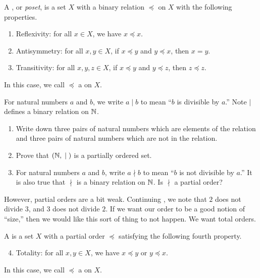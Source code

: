 \documentclass[../notes.tex]{subfiles}
\begin{document}
\begin{definition}
    A , or \textit{poset}, is a set $X$ with a binary relation $\preceq$ on $X$ with the following properties.
    \begin{enumerate}[label=(\alph*)]
        \item Reflexivity: for all $x \in X$, we have $x \preceq x$.
        \item Antisymmetry: for all $x, y \in X$, if $x \preceq y$ and $y \preceq x$, then $x = y$.
        \item Transitivity: for all $x, y, z \in X$, if $x \preceq y$ and $y \preceq z$, then $z \preceq z$.
    \end{enumerate}
    In this case, we call $\preceq$ a  on $X$. %
\end{definition}
\begin{exercise} \label{exe:div-on-n}
    For natural numbers $a$ and $b$, we write $a \mid b$ to mean ``$b$ is divisible by $a$.'' Note $\mid$ defines a binary relation on $\mathbb N$.
    \begin{enumerate}[label=(\alph*)]
        \item Write down three pairs of natural numbers which are elements of the relation and three pairs of natural numbers which are not in the relation.
        \item Prove that $(\mathbb N, {}\mid{})$ is a partially ordered set.
        \item For natural numbers $a$ and $b$, write $a\nmid b$ to mean ``$b$ is not divisible by $a$.'' It is also true that $\nmid$ is a binary relation on $\mathbb N$. Is $\nmid$ a partial order?
    \end{enumerate}
\end{exercise}
However, partial orders are a bit weak. Continuing , we note that $2$ does not divide $3$, and $3$ does not divide $2$. If we want our order to be a good notion of ``size,'' then we would like this sort of thing to not happen. We want total orders.
\begin{definition}
    A  is a set $X$ with a partial order $\preceq$ satisfying the following fourth property.
    \begin{enumerate}[label=(\alph*)]
        \setcounter{enumi}{3}
        \item Totality: for all $x,y\in X$, we have $x\preceq y$ or $y\preceq x$.
    \end{enumerate}
    In this case, we call $\preceq$ a  on $X$.
\end{definition}
\end{document}
